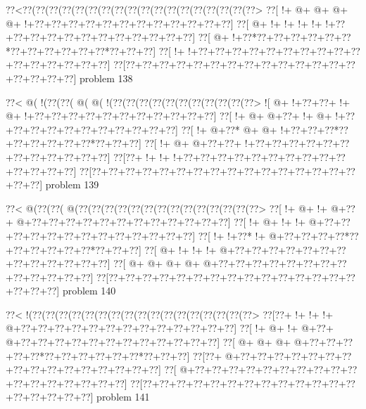 \vbox{\vbox{\goo
\0??<\0??(\0??(\0??(\0??(\0??(\0??(\0??(\0??(\0??(\0??(\0??(\0??(\0??(\0??(\0??(\0??(\0??(\0??>
\0??[\- !+\- @+\- @+\- @+\- @+\- !+\0??+\0??+\0??+\0??+\0??+\0??+\0??+\0??+\0??+\0??+\0??+\0??]
\0??[\- @+\- !+\- !+\- !+\- !+\- !+\0??+\0??+\0??+\0??+\0??+\0??+\0??+\0??+\0??+\0??+\0??+\0??]
\0??[\- @+\- !+\0??*\0??+\0??+\0??+\0??+\0??+\0??*\0??+\0??+\0??+\0??+\0??+\0??*\0??+\0??+\0??]
\0??[\- !+\- !+\0??+\0??+\0??+\0??+\0??+\0??+\0??+\0??+\0??+\0??+\0??+\0??+\0??+\0??+\0??+\0??]
\0??[\0??+\0??+\0??+\0??+\0??+\0??+\0??+\0??+\0??+\0??+\0??+\0??+\0??+\0??+\0??+\0??+\0??+\0??]
}
\hfil problem 138\hfil\break
}



\vbox{\vbox{\goo
\0??<\- @(\- !(\0??(\0??(\- @(\- @(\- !(\0??(\0??(\0??(\0??(\0??(\0??(\0??(\0??(\0??(\0??(\0??>
\- ![\- @+\- !+\0??+\0??+\- !+\- @+\- !+\0??+\0??+\0??+\0??+\0??+\0??+\0??+\0??+\0??+\0??+\0??]
\0??[\- !+\- @+\- @+\0??+\- !+\- @+\- !+\0??+\0??+\0??+\0??+\0??+\0??+\0??+\0??+\0??+\0??+\0??]
\0??[\- !+\- @+\0??*\- @+\- @+\- !+\0??+\0??+\0??*\0??+\0??+\0??+\0??+\0??+\0??*\0??+\0??+\0??]
\0??[\- !+\- @+\- @+\0??+\0??+\- !+\0??+\0??+\0??+\0??+\0??+\0??+\0??+\0??+\0??+\0??+\0??+\0??]
\0??[\0??+\- !+\- !+\- !+\0??+\0??+\0??+\0??+\0??+\0??+\0??+\0??+\0??+\0??+\0??+\0??+\0??+\0??]
\0??[\0??+\0??+\0??+\0??+\0??+\0??+\0??+\0??+\0??+\0??+\0??+\0??+\0??+\0??+\0??+\0??+\0??+\0??]
}
\hfil problem 139\hfil\break
}



\vbox{\vbox{\goo
\0??<\- @(\0??(\0??(\- @(\0??(\0??(\0??(\0??(\0??(\0??(\0??(\0??(\0??(\0??(\0??(\0??(\0??(\0??>
\0??[\- !+\- @+\- !+\- @+\0??+\- @+\0??+\0??+\0??+\0??+\0??+\0??+\0??+\0??+\0??+\0??+\0??+\0??]
\0??[\- !+\- @+\- !+\- !+\- @+\0??+\0??+\0??+\0??+\0??+\0??+\0??+\0??+\0??+\0??+\0??+\0??+\0??]
\0??[\- !+\- !+\0??*\- !+\- @+\0??+\0??+\0??+\0??*\0??+\0??+\0??+\0??+\0??+\0??*\0??+\0??+\0??]
\0??[\- @+\- !+\- !+\- !+\- @+\0??+\0??+\0??+\0??+\0??+\0??+\0??+\0??+\0??+\0??+\0??+\0??+\0??]
\0??[\- @+\- @+\- @+\- @+\- @+\0??+\0??+\0??+\0??+\0??+\0??+\0??+\0??+\0??+\0??+\0??+\0??+\0??]
\0??[\0??+\0??+\0??+\0??+\0??+\0??+\0??+\0??+\0??+\0??+\0??+\0??+\0??+\0??+\0??+\0??+\0??+\0??]
}
\hfil problem 140\hfil\break
}



\vbox{\vbox{\goo
\0??<\- !(\0??(\0??(\0??(\0??(\0??(\0??(\0??(\0??(\0??(\0??(\0??(\0??(\0??(\0??(\0??(\0??(\0??>
\0??[\0??+\- !+\- !+\- !+\- @+\0??+\0??+\0??+\0??+\0??+\0??+\0??+\0??+\0??+\0??+\0??+\0??+\0??]
\0??[\- !+\- @+\- !+\- @+\0??+\- @+\0??+\0??+\0??+\0??+\0??+\0??+\0??+\0??+\0??+\0??+\0??+\0??]
\0??[\- @+\- @+\- @+\- @+\0??+\0??+\0??+\0??+\0??*\0??+\0??+\0??+\0??+\0??+\0??*\0??+\0??+\0??]
\0??[\0??+\- @+\0??+\0??+\0??+\0??+\0??+\0??+\0??+\0??+\0??+\0??+\0??+\0??+\0??+\0??+\0??+\0??]
\0??[\- @+\0??+\0??+\0??+\0??+\0??+\0??+\0??+\0??+\0??+\0??+\0??+\0??+\0??+\0??+\0??+\0??+\0??]
\0??[\0??+\0??+\0??+\0??+\0??+\0??+\0??+\0??+\0??+\0??+\0??+\0??+\0??+\0??+\0??+\0??+\0??+\0??]
}
\hfil problem 141\hfil\break
}




